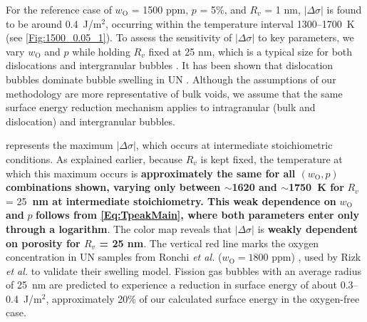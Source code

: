 \documentclass[preprint,12pt,sort&compress]{elsarticle}
\newcommand{\?}{\stackrel{?}{=}}
\providecommand{\DIFaddtex}[1]{{\bf #1}} %
\providecommand{\DIFdeltex}[1]{} %
\providecommand{\DIFaddbegin}{\protect\color{blue}} %
\providecommand{\DIFaddend}{\protect\color{black}} %
\providecommand{\DIFdelbegin}{\protect\color{red}} %
\providecommand{\DIFdelend}{\protect\color{black}} %
\providecommand{\DIFadd}[1]{\texorpdfstring{\DIFaddtex{#1}}{#1}} %
\providecommand{\DIFdel}[1]{\texorpdfstring{\DIFdeltex{#1}}{}} %
\newcommand{\DIFscaledelfig}{0.5}
\newlength{\DIFdelgraphicswidth} %
\newlength{\DIFdelgraphicsheight} %
\newcommand{\DIFaddincludegraphics}[2][]{{\color{blue}\fbox{\DIFOincludegraphics[#1]{#2}}}} %
\newcommand{\DIFdelincludegraphics}[2][]{%
\sbox{\DIFdelgraphicsbox}{\DIFOincludegraphics[#1]{#2}}%
\settoboxwidth{\DIFdelgraphicswidth}{\DIFdelgraphicsbox} %
\settoboxtotalheight{\DIFdelgraphicsheight}{\DIFdelgraphicsbox} %
\scalebox{\DIFscaledelfig}{%
\parbox[b]{\DIFdelgraphicswidth}{\usebox{\DIFdelgraphicsbox}\\[-\baselineskip] \rule{\DIFdelgraphicswidth}{0em}}\llap{\resizebox{\DIFdelgraphicswidth}{\DIFdelgraphicsheight}{%
\setlength{\unitlength}{\DIFdelgraphicswidth}%
\begin{picture}(1,1)%
\thicklines\linethickness{2pt} %
{\color[rgb]{1,0,0}\put(0,0){\framebox(1,1){}}}%
{\color[rgb]{1,0,0}\put(0,0){\line( 1,1){1}}}%
{\color[rgb]{1,0,0}\put(0,1){\line(1,-1){1}}}%
\end{picture}%
}\hspace*{3pt}}} %
} %
\DeclareRobustCommand{\DIFaddbegin}{\DIFOaddbegin \let\includegraphics\DIFaddincludegraphics} %
\DeclareRobustCommand{\DIFaddend}{\DIFOaddend \let\includegraphics\DIFOincludegraphics} %
\DeclareRobustCommand{\DIFdelbegin}{\DIFOdelbegin \let\includegraphics\DIFdelincludegraphics} %
\DeclareRobustCommand{\DIFdelend}{\DIFOaddend \let\includegraphics\DIFOincludegraphics} %
\begin{document}
\DIFaddbegin 



\DIFaddend For the reference case of $w_\text{O}$ = 1500 ppm, $p$ = 5\%, and $R_v$ = 1 nm, $|\Delta \sigma|$ is found to be around 0.4~J/m$^2$, occurring within the temperature interval 1300--1700~K (see \cref{Fig:1500_0.05_1}). To assess the sensitivity of $|\Delta \sigma|$ to key parameters, we vary $w_\text{O}$ and $p$ while holding $R_v$ fixed at 25 nm, which is a typical size for both dislocations and intergranular bubbles \cite{Colin1983}. It has been shown that dislocation bubbles dominate bubble swelling in UN \cite{Ronchi1975,Ronchi1978,Rizk2025}. Although the assumptions of our methodology are more representative of bulk voids, we assume that the same surface energy reduction mechanism applies to intragranular (bulk and dislocation) and intergranular bubbles.

 represents the maximum $|\Delta \sigma|$, which occurs at intermediate stoichiometric conditions. As explained earlier, because $R_v$ is kept fixed, the temperature at which this maximum occurs is \DIFdelbegin \DIFdel{the same (1800 K in the case of }\DIFdelend \DIFaddbegin \DIFadd{approximately the same for all $(w_\text{O}, p)$ combinations shown, varying only between $\sim$1620 and $\sim$1750~K for }\DIFaddend $R_v$ = 25\DIFdelbegin \DIFdel{nm), independent of }\DIFdelend \DIFaddbegin \DIFadd{~nm at intermediate stoichiometry. This weak dependence on }\DIFaddend $w_\text{O}$ \DIFdelbegin \DIFdel{or }\DIFdelend \DIFaddbegin \DIFadd{and }\DIFaddend $p$ \DIFaddbegin \DIFadd{follows from \cref{Eq:TpeakMain}, where both parameters enter only through a logarithm}\DIFaddend . The color map reveals that $|\Delta \sigma|$ is \DIFdelbegin \DIFdel{nearly independent of porosity }\DIFdelend \DIFaddbegin \DIFadd{weakly dependent on porosity for $R_v$ = 25 nm}\DIFaddend . The vertical red line marks the oxygen concentration in UN samples from Ronchi \textit{et al.} ($w_\text{O} = 1800$ ppm) \cite{Ronchi1975,Ronchi1978}, used by Rizk \textit{et al.} \cite{Rizk2025} to validate their swelling model. Fission gas bubbles with an average radius of 25~nm are predicted to experience a reduction in surface energy of about 0.3--0.4~J/m$^2$, approximately 20\% of our calculated surface energy in the oxygen-free case.
\end{document}
